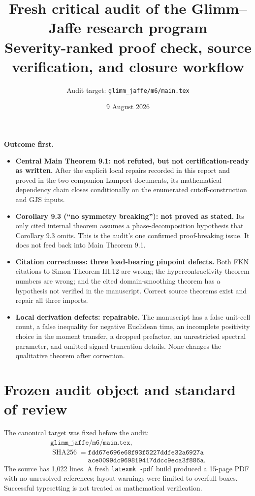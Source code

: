 \documentclass[10pt,a4paper]{article}
\title{Fresh critical audit of the Glimm--Jaffe research program\\[3pt]
\large Severity-ranked proof check, source verification, and closure workflow}
\author{Audit target: \texttt{glimm\_jaffe/m6/main.tex}}
\date{9 August 2026}
\begin{document}
\maketitle

\begin{resultbox}
\textbf{Outcome first.}

\begin{itemize}
\item \textbf{Central Main Theorem 9.1: not refuted, but not certification-ready as
written.}  After the explicit local repairs recorded in this report and proved in the two
companion Lamport documents, its mathematical dependency chain closes conditionally on
the enumerated cutoff-construction and GJS inputs.
\item \textbf{Corollary 9.3 (``no symmetry breaking''): not proved as stated.}  Its only
cited internal theorem assumes a phase-decomposition hypothesis that Corollary 9.3 omits.
This is the audit's one confirmed proof-breaking issue.  It does not feed back into Main
Theorem 9.1.
\item \textbf{Citation correctness: three load-bearing pinpoint defects.}  Both FKN
citations to Simon Theorem III.12 are wrong; the hypercontractivity theorem numbers are
wrong; and the cited domain-smoothing theorem has a hypothesis not verified in the
manuscript.  Correct source theorems exist and repair all three imports.
\item \textbf{Local derivation defects: repairable.}  The manuscript has a false unit-cell
count, a false inequality for negative Euclidean time, an incomplete positivity choice in
the moment transfer, a dropped prefactor, an unrestricted spectral parameter, and omitted
signed truncation details.  None changes the qualitative theorem after correction.
\end{itemize}
\end{resultbox}

\tableofcontents

\section{Frozen audit object and standard of review}

The canonical target was fixed before the audit:
\[
 \begin{gathered}
 \texttt{glimm\_jaffe/m6/main.tex},\\
 \operatorname{SHA256}=\texttt{fdd67e696e68f93f5227ddfe32a6927a}\\[-2pt]
 \phantom{\operatorname{SHA256}=}\texttt{ace0099dc969819417ddcc9eca3f886a}.
 \end{gathered}
\]
The source has 1,022 lines.  A fresh \texttt{latexmk -pdf} build produced a 15-page PDF
with no unresolved references; layout warnings were limited to overfull boxes.  Successful
typesetting is not treated as mathematical verification.
\end{document}
